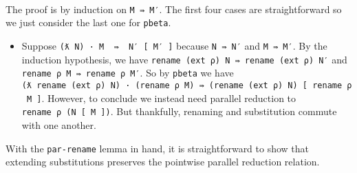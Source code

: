 \begin{fence}
\begin{code}
\AgdaSpace{}%
\AgdaSymbol{)}\<%
\\
\>[0][@{}l@{\AgdaIndent{0}}]%
\>[4]\AgdaSpace{}%
\AgdaSpace{}%
\AgdaSymbol{(}\AgdaSymbol{\{}\AgdaSpace{}%
\AgdaSymbol{=}\AgdaSpace{}%
\AgdaSpace{}%
\AgdaSymbol{\}}\AgdaSpace{}%
\AgdaSymbol{)}\AgdaSpace{}%
\AgdaSymbol{(}\AgdaSymbol{\{}\AgdaSpace{}%
\AgdaSymbol{=}\AgdaSpace{}%
\AgdaSymbol{\}}\AgdaSpace{}%
\AgdaSymbol{)}\<%
\\
\>[0]\AgdaSpace{}%
\AgdaSymbol{|}\AgdaSpace{}%
\AgdaSpace{}%
\AgdaSpace{}%
\AgdaSymbol{\{}\AgdaSymbol{\}\{}\AgdaSymbol{\}\{}\AgdaSymbol{\}\{}\AgdaSymbol{\}\{}\AgdaSymbol{\}}\AgdaSpace{}%
\AgdaSymbol{=}\AgdaSpace{}%
\<%
\\
\>[0]\<%
\end{code}
\end{fence}

The proof is by induction on \texttt{M\ ⇛\ M′}. The first four cases are
straightforward so we just consider the last one for \texttt{pbeta}.

\begin{itemize}
\tightlist
\item
  Suppose \texttt{(ƛ\ N)\ ·\ M\ \ ⇛\ \ N′\ {[}\ M′\ {]}} because
  \texttt{N\ ⇛\ N′} and \texttt{M\ ⇛\ M′}. By the induction hypothesis,
  we have \texttt{rename\ (ext\ ρ)\ N\ ⇛\ rename\ (ext\ ρ)\ N′} and
  \texttt{rename\ ρ\ M\ ⇛\ rename\ ρ\ M′}. So by \texttt{pbeta} we have
  \texttt{(ƛ\ rename\ (ext\ ρ)\ N)\ ·\ (rename\ ρ\ M)\ ⇛\ (rename\ (ext\ ρ)\ N)\ {[}\ rename\ ρ\ M\ {]}}.
  However, to conclude we instead need parallel reduction to
  \texttt{rename\ ρ\ (N\ {[}\ M\ {]})}. But thankfully, renaming and
  substitution commute with one another.
\end{itemize}

With the \texttt{par-rename} lemma in hand, it is straightforward to
show that extending substitutions preserves the pointwise parallel
reduction relation.


